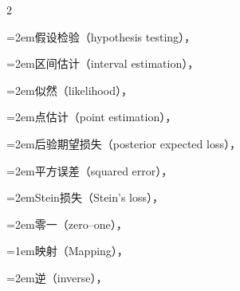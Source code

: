 \begin{multicols}{2}
\par\noindent\hangindent=2em\hspace*{1em}\label{idx:656}假设检验（hypothesis testing），\hyperref[eq:8.3.11]{\pageref*{eq:8.3.11}}\par
\par\noindent\hangindent=2em\hspace*{1em}\label{idx:657}区间估计（interval estimation），\hyperref[eq:9.3.4]{\pageref*{eq:9.3.4}}\par
\par\noindent\hangindent=2em\hspace*{1em}\label{idx:658}似然（likelihood），\hyperref[ex:7.3.27]{\pageref*{ex:7.3.27}}\par
\par\noindent\hangindent=2em\hspace*{1em}\label{idx:659}点估计（point estimation），\hyperref[ex:7.3.28]{\pageref*{ex:7.3.28}}\par
\par\noindent\hangindent=2em\hspace*{1em}\label{idx:660}后验期望损失（posterior expected loss），\hyperref[eq:7.3.19]{\pageref*{eq:7.3.19}}\par
\par\noindent\hangindent=2em\hspace*{1em}\label{idx:661}平方误差（squared error），\hyperref[ex:7.3.28]{\pageref*{ex:7.3.28}}\par
\par\noindent\hangindent=2em\hspace*{1em}\label{idx:662}Stein损失（Stein’s loss），\hyperref[ex:7.3.27]{\pageref*{ex:7.3.27}}\par
\par\noindent\hangindent=2em\hspace*{1em}\label{idx:663}零一（zero–one），\hyperref[eq:8.3.11]{\pageref*{eq:8.3.11}}\par
\par\addvspace{2pt}
\par\noindent\hangindent=1em\hspace*{0em}\label{idx:664}映射（Mapping），\hyperref[idxocc:664:69]{\pageref*{idxocc:664:69}}\par
\par\noindent\hangindent=2em\hspace*{1em}\label{idx:665}逆（inverse），\hyperref[idxocc:665:69]{\pageref*{idxocc:665:69}}\par

\end{multicols}
